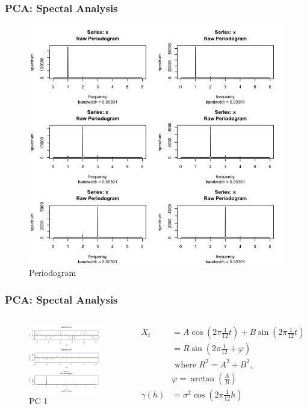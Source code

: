 \documentclass{beamer}
\begin{document}
\begin{frame}
\frametitle{PCA: Spectal Analysis}
\begin{figure}
	\centering
	\includegraphics[width=0.7\linewidth]{../img/PCA_periodogram}
	\caption{Periodogram}
	\label{fig:pcaperiodogram}
\end{figure}
\end{frame}

\begin{frame}
\frametitle{PCA: Spectal Analysis}
\begin{columns}
	\column{2.5in}
	\begin{figure}
		\centering
		\includegraphics[width=0.7\linewidth]{../img/PCA_pc1}
		\caption{PC 1}
		\label{fig:pcapc1}
	\end{figure}
 \column{2.5in}
 \begin{align*}
 X_t &= A\cos(2\pi\frac{1}{12}t) + B\sin(2\pi\frac{1}{12}t)  \\ 
 &= R\sin(2\pi\frac{1}{12} + \varphi)\\
 & \text{ where } R^2 = A^2 + B^2, \\
 &\varphi = \arctan(\frac{A}{B}) \\
 \gamma(h) &= \sigma^2\cos(2\pi\frac{1}{12}h) \\
 \end{align*}
\end{columns}
\end{frame}
\end{document}
